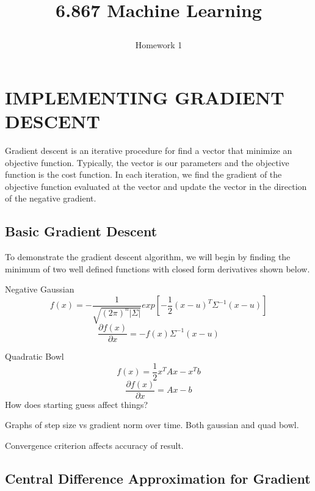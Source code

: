 \documentclass[a4paper,twoside]{article}
\begin{document}
\title{6.867 Machine Learning  \subtitle{Homework 1} }


\section{\uppercase{Implementing Gradient Descent}}

\noindent Gradient descent is an iterative procedure for find a vector that minimize an objective function. Typically, the vector is our parameters and the objective function is the cost function. In each iteration, we find the gradient of the objective function evaluated at the vector and update the vector in the direction of the negative gradient.

\subsection{Basic Gradient Descent}

\noindent To demonstrate the gradient descent algorithm, we will begin by finding the minimum of two well defined functions with closed form derivatives shown below.

\medskip
\noindent Negative Gaussian
\begin{equation}
f(x) = - \frac{1}{\sqrt{(2\pi)^n |\Sigma|}} exp[-\frac{1}{2} (x-u)^T\Sigma^{-1}(x-u)]
\end{equation}
\begin{equation}
\frac{\partial f(x)}{\partial x} = -f(x) \Sigma^{-1} (x-u)
\end{equation}


\noindent Quadratic Bowl
\begin{equation}
f(x) = \frac{1}{2} x^T A x - x^T b
\end{equation}
\begin{equation}
\frac{\partial f(x)}{\partial x} = Ax - b
\end{equation}
How does starting guess affect things?

Graphs of step size vs gradient norm over time.
Both gaussian and quad bowl.

Convergence criterion affects accuracy of result.

\subsection{Central Difference Approximation for Gradient}
\end{document}
